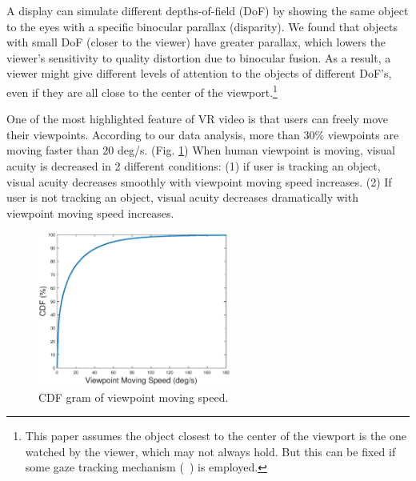  
A \vr display can simulate different depths-of-field (DoF) by showing the same object to the eyes with a specific binocular parallax (disparity). 
We found that objects with small DoF (\ie closer to the viewer) have greater parallax, which lowers the viewer's sensitivity to quality distortion due to binocular fusion.
As a result, a viewer might give different levels of attention to the objects of different DoF's, even if they are all close to the center of the viewport.\footnote{This paper assumes the object closest to the center of the viewport is the one watched by the viewer, which may not always hold. But this can be fixed if some gaze tracking mechanism (\eg~\cite{??,??}) is employed.}






One of the most highlighted feature of VR video is that users can freely move their viewpoints. According to our data analysis, more than 30\% viewpoints are moving faster than 20 deg/s. (Fig. \ref{CDFspeed}) 
When human viewpoint is moving, visual acuity is decreased in 2 different conditions: (1) if user is tracking an object, visual acuity decreases smoothly with viewpoint moving speed increases. (2) If user is not tracking an object, visual acuity decreases dramatically with viewpoint moving speed increases. \cite{speed}

\begin{figure}
  \centering
  \includegraphics[width=2.5in]{images/speed_CDF.eps}
  \caption{CDF gram of viewpoint moving speed.}
  \label{CDFspeed}
  \end{figure}




